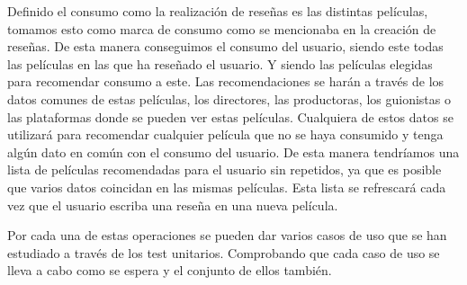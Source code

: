 Definido el consumo como la realización de reseñas es las distintas películas, tomamos esto como marca 
de consumo como se mencionaba en la creación de reseñas. De esta manera conseguimos el consumo del 
usuario, siendo este todas las películas en las que ha reseñado el usuario. Y siendo las películas 
elegidas para recomendar consumo a este. Las recomendaciones se harán a través de los datos comunes de 
estas películas, los directores, las productoras, los guionistas o las plataformas donde se pueden ver 
estas películas. Cualquiera de estos datos se utilizará para recomendar cualquier película que no se 
haya consumido y tenga algún dato en común con el consumo del usuario. De esta manera tendríamos una 
lista de películas recomendadas para el usuario sin repetidos, ya que es posible que varios datos 
coincidan en las mismas películas. Esta lista se refrescará cada vez que el usuario escriba una reseña 
en una nueva película.

Por cada una de estas operaciones se pueden dar varios casos de uso que se han estudiado a través de 
los test unitarios. Comprobando que cada caso de uso se lleva a cabo como se espera y el conjunto de 
ellos también.
